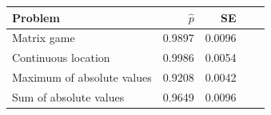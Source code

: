 \begin{tabular}{lrrrr}
\toprule
Problem & $\hat p$ & SE \\
\midrule
Matrix game & 0.9897 & 0.0096 \\
Continuous location & 0.9986 & 0.0054 \\
Maximum of absolute values & 0.9208 & 0.0042 \\
Sum of absolute values & 0.9649 & 0.0096 \\
\bottomrule
\end{tabular}